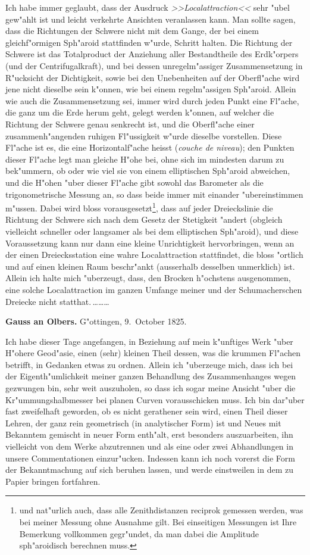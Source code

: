 \documentclass[12pt,a4paper]{article}
\theoremstyle{plain}
\theoremstyle{definition}
\theoremstyle{remark}
\begin{document}
Ich habe immer geglaubt, dass der Ausdruck \emph{>>Localattraction<<} sehr "ubel gew"ahlt ist und leicht verkehrte Ansichten veranlassen kann. Man sollte sagen, dass die Richtungen der Schwere nicht mit dem Gange, der bei einem gleichf"ormigen Sph"aroid stattfinden w"urde, Schritt halten. Die Richtung der Schwere ist das Totalproduct der Anziehung aller Bestandtheile des Erdk"orpers (und der Centrifugalkraft), und bei dessen unregelm"assiger Zusammensetzung in R"ucksicht der Dichtigkeit, sowie bei den Unebenheiten auf der Oberfl"ache wird jene nicht dieselbe sein k"onnen, wie bei einem regelm"assigen Sph"aroid. Allein wie auch die Zusammensetzung sei, immer wird durch jeden Punkt eine Fl"ache, die ganz um die Erde herum geht, gelegt werden k"onnen, auf welcher die Richtung der Schwere genau senkrecht ist, und die Oberfl"ache einer zusammenh"angenden ruhigen Fl"ussigkeit w"urde dieselbe vorstellen. Diese Fl"ache ist es, die eine Horizontalf"ache heisst (\emph{couche de niveau}); den Punkten dieser Fl"ache legt man gleiche H"ohe bei, ohne sich im mindesten darum zu bek"ummern, ob oder wie viel sie von einem elliptischen Sph"aroid abweichen, und die H"ohen "uber dieser Fl"ache gibt sowohl das Barometer als die trigonometrische Messung an, so dass beide immer mit einander "ubereinstimmen m"ussen. Dabei wird bloss vorausgesetzt\footnote{und nat"urlich auch, dass alle Zenithdistanzen reciprok gemessen werden, was bei meiner Messung ohne Ausnahme gilt. Bei einseitigen Messungen ist Ihre Bemerkung vollkommen gegr"undet, da man dabei die Amplitude sph"aroidisch berechnen muss.}, dass auf jeder Dreieckslinie die Richtung der Schwere sich nach dem Gesetz der Stetigkeit "andert (obgleich vielleicht schneller oder langsamer als bei dem elliptischen Sph"aroid), und diese Voraussetzung kann nur dann eine kleine Unrichtigkeit hervorbringen, wenn an der einen Dreiecksstation eine wahre Localattraction stattfindet, die bloss "ortlich und auf einen kleinen Raum beschr"ankt (ausserhalb desselben unmerklich) ist. Allein ich halte mich "uberzeugt, dass, den Brocken h"ochstens ausgenommen, eine solche Localattraction im ganzen Umfange meiner und der Schumacherschen Dreiecke nicht statthat.\,\ldots\ldots\ldots

\newpage
\noindent \textbf{Gauss an Olbers.} G"ottingen, 9.~October 1825.

\medskip
\noindent Ich habe dieser Tage angefangen, in Beziehung auf mein k"unftiges Werk "uber H"ohere Geod"asie, einen (sehr) kleinen Theil dessen, was die krummen Fl"achen betrifft, in Gedanken etwas zu ordnen. Allein ich "uberzeuge mich, dass ich bei der Eigenth"umlichkeit meiner ganzen Behandlung des Zusammenhanges wegen gezwungen bin, sehr weit auszuholen, so dass ich sogar meine Ansicht "uber die Kr"ummungshalbmesser bei planen Curven vorausschicken muss. Ich bin dar"uber fast zweifelhaft geworden, ob es nicht gerathener sein wird, einen Theil dieser Lehren, der ganz rein geometrisch (in analytischer Form) ist und Neues mit Bekanntem gemischt in neuer Form enth"alt, erst besonders auszuarbeiten, ihn vielleicht von dem Werke abzutrennen und als eine oder zwei Abhandlungen in unsere Commentationen einzur"ucken. Indessen kann ich noch vorerst die Form der Bekanntmachung auf sich beruhen lassen, und werde einstweilen in dem zu Papier bringen fortfahren.
\end{document}
